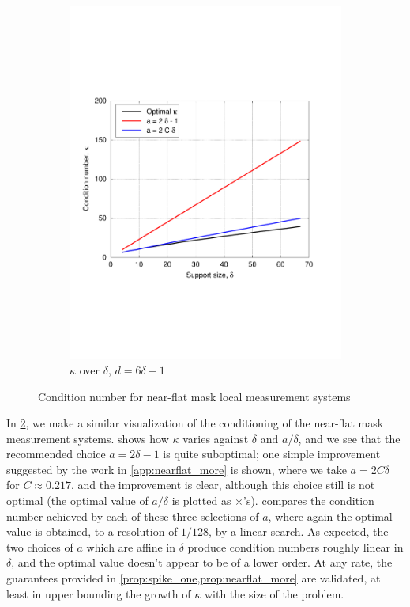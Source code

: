 \begin{figure}[hbt]
\begin{subfigure}[b]{.49\textwidth}
      \includegraphics[width=\textwidth,trim={.2in 2.5in 1in 2.5in}]{figs/flatchart}
      \caption{$\kappa$ over $\delta$, $d = 6 \delta - 1$}
      \label{fig:flatchart}
    \end{subfigure}
    
    \caption{Condition number for near-flat mask local measurement systems}
    \label{fig:flat_kappa}
  \end{figure}

In \cref{fig:flat_kappa}, we make a similar visualization of the conditioning of the near-flat mask measurement systems.   shows how $\kappa$ varies against $\delta$ and $a / \delta$, and we see that the recommended choice $a = 2 \delta - 1$ is quite suboptimal; one simple improvement suggested by the work in \cref{app:nearflat_more} is shown, where we take $a = 2 C \delta$ for $C \approx 0.217$, and the improvement is clear, although this choice still is not optimal (the optimal value of $a / \delta$ is plotted as $\times$'s).   compares the condition number achieved by each of these three selections of $a$, where again the optimal value is obtained, to a resolution of $1 / 128$, by a linear search.  As expected, the two choices of $a$ which are affine in $\delta$ produce condition numbers roughly linear in $\delta$, and the optimal value doesn't appear to be of a lower order.  At any rate, the guarantees provided in \cref{prop:spike_one,prop:nearflat_more} are validated, at least in upper bounding the growth of $\kappa$ with the size of the problem.

